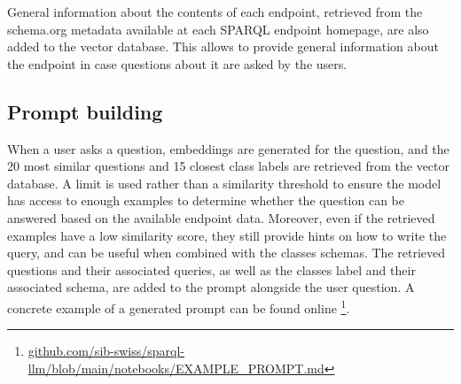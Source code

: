 \documentclass[
]{ceurart}
\begin{document}

General information about the contents of each endpoint, retrieved from the schema.org metadata available at each SPARQL endpoint homepage, are also added to the vector database. This allows to provide general information about the endpoint in case questions about it are asked by the users. 

\subsection{Prompt building}


When a user asks a question, embeddings are generated for the question, and the 20 most similar questions and 15 closest class labels are retrieved from the vector database. A limit is used rather than a similarity threshold to ensure the model has access to enough examples to determine whether the question can be answered based on the available endpoint data. Moreover, even if the retrieved examples have a low similarity score, they still provide hints on how to write the query, and can be useful when combined with the classes schemas. The retrieved questions and their associated queries, as well as the classes label and their associated schema, are added to the prompt alongside the user question. A concrete example of a generated prompt can be found online \footnote{\href{https://github.com/sib-swiss/sparql-llm/blob/main/notebooks/EXAMPLE_PROMPT.md}{github.com/sib-swiss/sparql-llm/blob/main/notebooks/EXAMPLE\_PROMPT.md}}.



\end{document}
